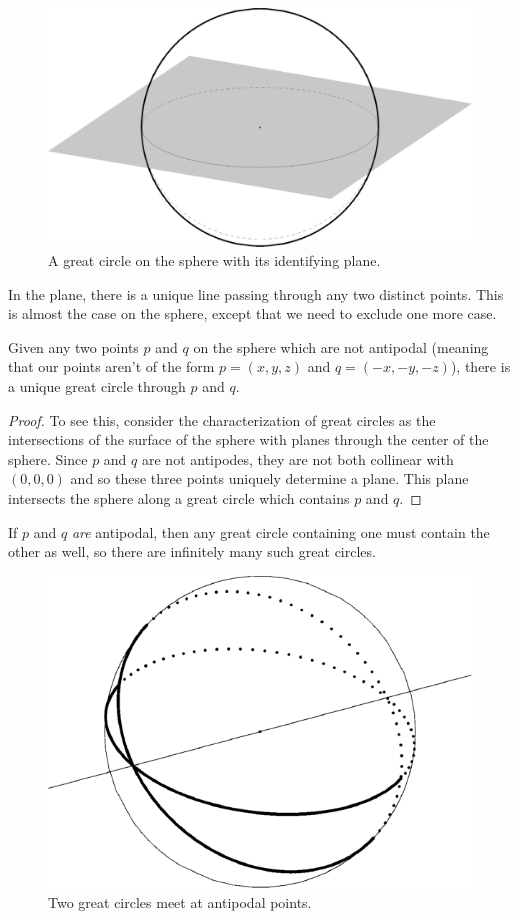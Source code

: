 \begin{figure}[htb]
	\centering
	\includegraphics[width=.5\textwidth]{figs/sph-1pl.pdf}
	\caption{A great circle on the sphere with its identifying plane.}
	\label{fig:sphereline}
\end{figure}


In the plane, there is a unique line passing through any two distinct points.  This is almost the case on the sphere, except that we need to exclude one more case.


\begin{observation}
	Given any two points $p$ and $q$ on the sphere which are not antipodal (meaning that our points aren't of the form $p=(x,y,z)$ and $q=(-x,-y,-z)$), there is a unique great circle through $p$ and $q$. 
\end{observation}
\begin{proof}
	To see this, consider the characterization of great circles as the intersections of the surface of the sphere with planes through the center of the sphere.  Since $p$ and $q$ are not antipodes, they are not both collinear with $(0,0,0)$ and so these three points uniquely determine a plane.  This plane intersects the sphere along a great circle which contains $p$ and $q$.
\end{proof}

If $p$ and $q$ \textit{are} antipodal, then any great circle containing one must contain the other as well, so there are infinitely many such great circles.

\begin{figure}[htb]
	\centering
	\includegraphics[width=.35\textwidth]{figs/2gc.pdf}
	\caption{Two great circles meet at antipodal points.}
	\label{fig:2gc}
\end{figure}


